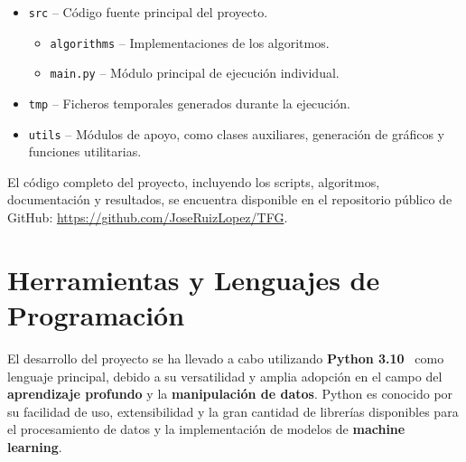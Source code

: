 \begin{itemize}
      \item \texttt{src} -- Código fuente principal del proyecto.
            \begin{itemize}
                  \item \texttt{algorithms} -- Implementaciones de los algoritmos.
                  \item \texttt{main.py} -- Módulo principal de ejecución individual.
            \end{itemize}
      \item \texttt{tmp} -- Ficheros temporales generados durante la ejecución.
      \item \texttt{utils} -- Módulos de apoyo, como clases auxiliares, generación de gráficos y funciones utilitarias.
\end{itemize}

El código completo del proyecto, incluyendo los scripts, algoritmos, documentación y resultados,
se encuentra disponible en el repositorio público de GitHub: \url{https://github.com/JoseRuizLopez/TFG}.


\section{Herramientas y Lenguajes de Programación}\label{sec:herramientas-y-lenguajes-de-programacion}
El desarrollo del proyecto se ha llevado a cabo utilizando \textbf{Python 3.10}~\cite{vanderplasPythonDataScience2016} como
lenguaje principal, debido a su versatilidad y amplia adopción en el campo del \textbf{aprendizaje profundo} y la
\textbf{manipulación de datos}.
Python es conocido por su facilidad de uso, extensibilidad y la gran cantidad de librerías disponibles para el
procesamiento de datos y la implementación de modelos de \textbf{machine learning}.


